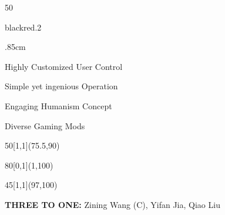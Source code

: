 \documentclass[hyperref={pdfpagelabels=false}]{beamer}
\begin{document}
\begin{frame}
\begin{textblock}{50}
\begin{transparentbox}{black}{red}{.2}
\begin{itemize}\itemsep .85cm
			{ \item Highly Customized User Control

				\item Simple yet ingenious Operation

				\item Engaging Humanism Concept

				\item  Diverse Gaming Mods}
\end{itemize}       	 

		\end{transparentbox}
	\end{textblock} 




\begin{textblock}{50}[1,1](75.5,90)
		\begin{blankbox}
			
			
		\end{blankbox}
	\end{textblock}

	\begin{textblock}{80}[0,1](1,100)
		\logos[light]
	\end{textblock}

	\begin{textblock}{45}[1,1](97,100)
		\begin{blankbox}
			\huge\textbf{{THREE TO ONE:}} 
			\Large{Zining Wang (C),
			Yifan Jia,
			Qiao Liu }
			
		\end{blankbox}
	\end{textblock}


\end{frame}
\end{document}
